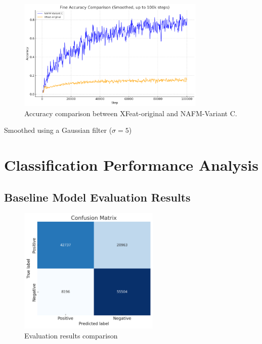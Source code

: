 \begin{figure}[H]
    \centering
    \includegraphics[width=0.8\textwidth]{ressources/comaprative_accuracy.png}
    \caption{Accuracy comparison between XFeat-original and NAFM-Variant C.}
    \label{fig:accuracy_comparison}
\end{figure}
{\footnotesize * Smoothed using a Gaussian filter ($\sigma=5$)\par}
\section{Classification Performance Analysis}

\subsection{Baseline Model Evaluation Results}

\begin{figure}[H]
    \centering
    \includegraphics[width=0.6\textwidth]{ressources/xfeat_cm.png}
    \caption{Evaluation results comparison}
    \label{fig:evaluation_results}
\end{figure}

